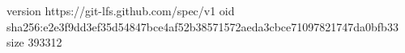 version https://git-lfs.github.com/spec/v1
oid sha256:e2e3f9dd3ef35d54847bce4af52b38571572aeda3cbce71097821747da0bfb33
size 393312
